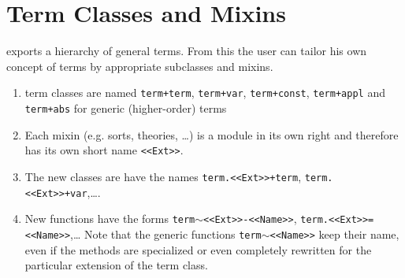 \section{Term Classes and Mixins}
{\keim} exports a hierarchy of general terms. From this the user can
tailor his own concept of terms by appropriate subclasses and mixins.
\begin{enumerate}
\item term classes are named {\tt term+term}, {\tt term+var}, {\tt term+const}, {\tt term+appl} and {\tt
term+abs} for generic (higher-order) terms
\item Each mixin (e.g. sorts, theories, \ldots) is a module in its own right and therefore has its 
      own short name {\tt <<Ext>>}.
\item The new classes are have the names {\tt term.<<Ext>>+term}, {\tt term.<<Ext>>+var},\ldots.
\item New functions have the forms {\tt term$\sim$<<Ext>>-<<Name>>}, {\tt term.<<Ext>>=<<Name>>},\ldots
Note that the generic functions {\tt term$\sim$<<Name>>} keep their name, even if the methods are 
specialized or even completely rewritten for the particular extension of the term class.
\end{enumerate}
